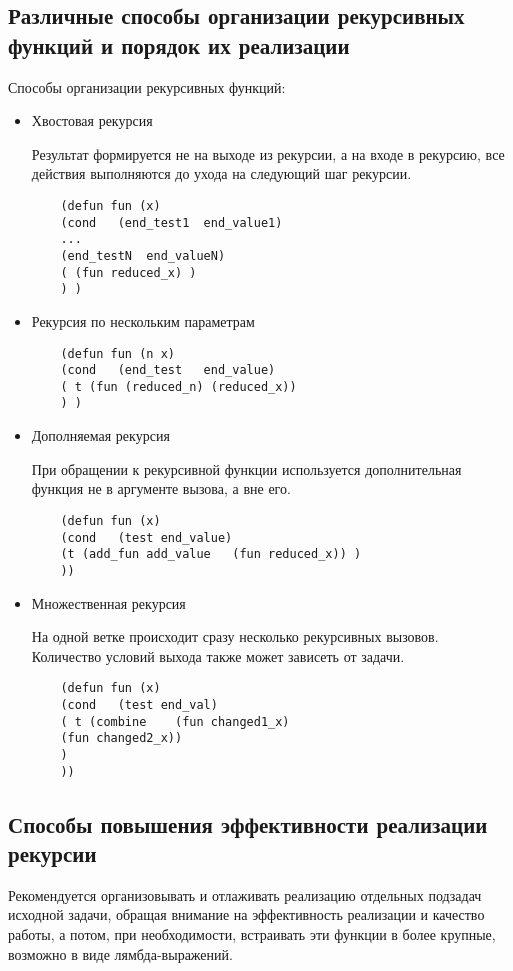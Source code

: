 \documentclass[a4paper,12pt]{article}
\begin{document}
\subsection*{Различные способы организации рекурсивных функций и порядок их реализации}

Способы организации рекурсивных функций:
\begin{itemize}
	\item Хвостовая рекурсия
	
	Результат формируется не на выходе из рекурсии, а на входе в рекурсию, все действия выполняются до ухода на следующий шаг рекурсии.
	\begin{lstlisting}
	(defun fun (x)
	(cond	(end_test1	end_value1)
	...
	(end_testN	end_valueN)
	( (fun reduced_x) )
	) )
	\end{lstlisting}
	\item Рекурсия по нескольким параметрам
	\begin{lstlisting}
	(defun fun (n x)
	(cond	(end_test	end_value)
	( t	(fun (reduced_n) (reduced_x))
	) )
	\end{lstlisting}
	\item Дополняемая рекурсия
	
	При обращении к рекурсивной функции используется дополнительная функция не в аргументе вызова, а вне его.
	\begin{lstlisting}
	(defun fun (x)
	(cond	(test end_value)
	(t (add_fun	add_value	(fun reduced_x)) )
	))
	\end{lstlisting}
	
	\item Множественная рекурсия
	
	На одной ветке происходит сразу несколько рекурсивных вызовов. Количество условий выхода также может зависеть от задачи.
	\begin{lstlisting}
	(defun fun (x)
	(cond	(test end_val)
	( t (combine	(fun changed1_x)
	(fun changed2_x))
	)
	))
	\end{lstlisting}
	
\end{itemize}

\subsection*{Способы повышения эффективности реализации рекурсии}
	
	Рекомендуется организовывать и отлаживать реализацию отдельных подзадач исходной задачи, обращая внимание на эффективность реализации и качество работы, а потом, при необходимости, встраивать эти функции в более крупные, возможно в виде  лямбда-выражений.
	
\end{document}

